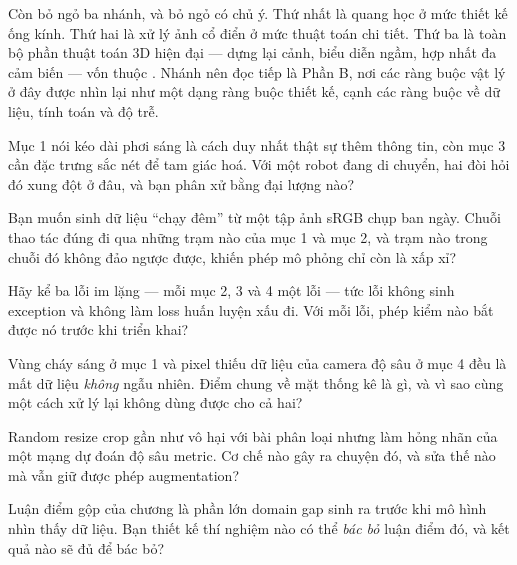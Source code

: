 \documentclass[../../deep_learning.tex]{subfiles}
\begin{document}
Còn bỏ ngỏ ba nhánh, và bỏ ngỏ có chủ ý. Thứ nhất là quang học ở mức thiết kế ống kính. Thứ hai là xử lý ảnh cổ điển ở mức thuật toán chi tiết. Thứ ba là toàn bộ phần thuật toán 3D hiện đại --- dựng lại cảnh, biểu diễn ngầm, hợp nhất đa cảm biến --- vốn thuộc . Nhánh nên đọc tiếp là Phần B, nơi các ràng buộc vật lý ở đây được nhìn lại như một dạng ràng buộc thiết kế, cạnh các ràng buộc về dữ liệu, tính toán và độ trễ.
\begin{tukiem}
\item Mục 1 nói kéo dài phơi sáng là cách duy nhất thật sự thêm thông tin, còn mục 3 cần đặc trưng sắc nét để tam giác hoá. Với một robot đang di chuyển, hai đòi hỏi đó xung đột ở đâu, và bạn phân xử bằng đại lượng nào?
\item Bạn muốn sinh dữ liệu ``chạy đêm'' từ một tập ảnh sRGB chụp ban ngày. Chuỗi thao tác đúng đi qua những trạm nào của mục 1 và mục 2, và trạm nào trong chuỗi đó không đảo ngược được, khiến phép mô phỏng chỉ còn là xấp xỉ?
\item Hãy kể ba lỗi im lặng --- mỗi mục 2, 3 và 4 một lỗi --- tức lỗi không sinh exception và không làm loss huấn luyện xấu đi. Với mỗi lỗi, phép kiểm nào bắt được nó trước khi triển khai?
\item Vùng cháy sáng ở mục 1 và pixel thiếu dữ liệu của camera độ sâu ở mục 4 đều là mất dữ liệu \emph{không} ngẫu nhiên. Điểm chung về mặt thống kê là gì, và vì sao cùng một cách xử lý lại không dùng được cho cả hai?
\item Random resize crop gần như vô hại với bài phân loại nhưng làm hỏng nhãn của một mạng dự đoán độ sâu metric. Cơ chế nào gây ra chuyện đó, và sửa thế nào mà vẫn giữ được phép augmentation?
\item Luận điểm gộp của chương là phần lớn domain gap sinh ra trước khi mô hình nhìn thấy dữ liệu. Bạn thiết kế thí nghiệm nào có thể \emph{bác bỏ} luận điểm đó, và kết quả nào sẽ đủ để bác bỏ?
\end{tukiem}
\ifSubfilesClassLoaded{\printbibliography[title={Nguồn}]}{}
\end{document}
